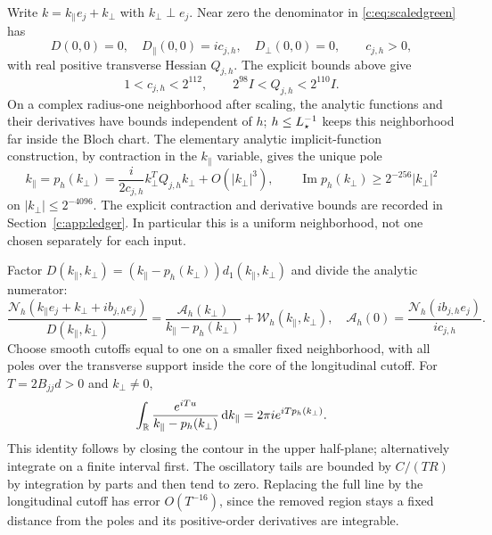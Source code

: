 Write $k=k_\parallel e_j+k_\perp$ with $k_\perp\perp e_j$. Near zero the denominator in
\eqref{c:eq:scaledgreen} has
\[
 D(0,0)=0,\quad D_\parallel(0,0)=ic_{j,h},\quad D_\perp(0,0)=0,
 \qquad c_{j,h}>0,
\]
with real positive transverse Hessian $Q_{j,h}$. The explicit bounds
above give
\begin{equation}
 1<c_{j,h}<2^{112},\qquad
 2^{98}I<Q_{j,h}<2^{110}I.                            \label{c:eq:polebounds}
\end{equation}
On a complex radius-one neighborhood after scaling, the analytic
functions and their derivatives have bounds independent of $h$;
$h\le L_\star^{-1}$ keeps this neighborhood far inside the Bloch chart.
The elementary analytic implicit-function construction, by contraction
in the $k_\parallel$ variable, gives the unique pole
\begin{equation}
 k_\parallel=p_h(k_\perp)=\frac{i}{2c_{j,h}}k_\perp^TQ_{j,h}k_\perp+O(|k_\perp|^3),
 \qquad \operatorname{Im}p_h(k_\perp)\ge2^{-256}|k_\perp|^2
                                                               \label{c:eq:pole}
\end{equation}
on $|k_\perp|\le2^{-4096}$. The explicit contraction and derivative bounds
are recorded in Section~\ref{c:app:ledger}. In particular this is a
uniform neighborhood, not one chosen separately for each input.

Factor $D(k_\parallel,k_\perp)=(k_\parallel-p_h(k_\perp))d_1(k_\parallel,k_\perp)$ and divide the analytic numerator:
\[
 \frac{\mathcal N_h(k_\parallel e_j+k_\perp+ib_{j,h}e_j)}{D(k_\parallel,k_\perp)}
   =\frac{\mathcal A_h(k_\perp)}{k_\parallel-p_h(k_\perp)}+\mathcal W_h(k_\parallel,k_\perp),
 \quad \mathcal A_h(0)=\frac{\mathcal N_h(ib_{j,h}e_j)}{ic_{j,h}}.
\]
Choose smooth cutoffs equal to one on a smaller fixed neighborhood,
with all poles over the transverse support inside the core of the
longitudinal cutoff. For $T=2B_{jj}d>0$ and $k_\perp\ne0$,
\[
 \int_{\mathbb R}\frac{e^{iTu}}{k_\parallel-p_h(k_\perp)}\,\mathrm d k_\parallel=2\pi i e^{iTp_h(k_\perp)}.
\]
This identity follows by closing the contour in the upper half-plane;
alternatively integrate on a finite interval first. The oscillatory
tails are bounded by $C/(TR)$ by integration by parts and then tend
to zero. Replacing the full line by the longitudinal cutoff has error
$O(T^{-16})$, since the removed region stays a fixed distance from the
poles and its positive-order derivatives are integrable.

